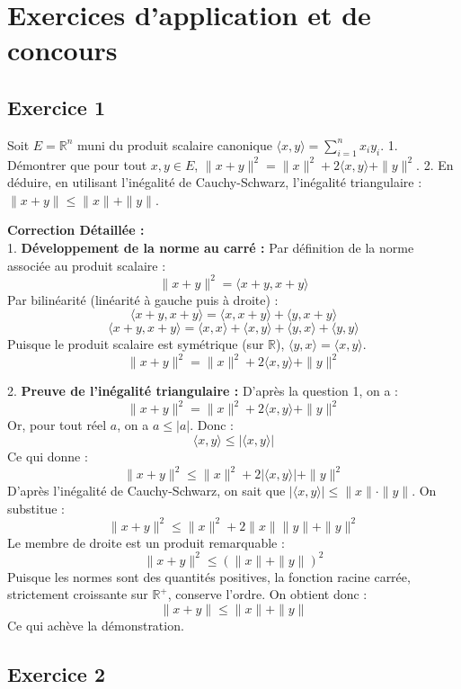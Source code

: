 \documentclass[11pt,a4paper]{report}
\begin{document}
\section{Exercices d'application et de concours}
\subsection*{Exercice 1}

Soit $E = \mathbb{R}^n$ muni du produit scalaire canonique $\langle x, y \rangle = \sum_{i=1}^n x_i y_i$.
1. Démontrer que pour tout $x, y \in E$, $\|x + y\|^2 = \|x\|^2 + 2\langle x, y \rangle + \|y\|^2$.
2. En déduire, en utilisant l'inégalité de Cauchy-Schwarz, l'inégalité triangulaire : $\|x + y\| \le \|x\| + \|y\|$.

\textbf{Correction Détaillée :}\\ 1. \textbf{Développement de la norme au carré :}
   Par définition de la norme associée au produit scalaire :
   $$\|x + y\|^2 = \langle x + y, x + y \rangle$$
   Par bilinéarité (linéarité à gauche puis à droite) :
   $$\langle x + y, x + y \rangle = \langle x, x + y \rangle + \langle y, x + y \rangle$$
   $$\langle x + y, x + y \rangle = \langle x, x \rangle + \langle x, y \rangle + \langle y, x \rangle + \langle y, y \rangle$$
   Puisque le produit scalaire est symétrique (sur $\mathbb{R}$), $\langle y, x \rangle = \langle x, y \rangle$.
   $$\|x + y\|^2 = \|x\|^2 + 2\langle x, y \rangle + \|y\|^2$$

2. \textbf{Preuve de l'inégalité triangulaire :}
   D'après la question 1, on a :
   $$\|x + y\|^2 = \|x\|^2 + 2\langle x, y \rangle + \|y\|^2$$
   Or, pour tout réel $a$, on a $a \le |a|$. Donc :
   $$\langle x, y \rangle \le |\langle x, y \rangle|$$
   Ce qui donne :
   $$\|x + y\|^2 \le \|x\|^2 + 2|\langle x, y \rangle| + \|y\|^2$$
   D'après l'inégalité de Cauchy-Schwarz, on sait que $|\langle x, y \rangle| \le \|x\| \cdot \|y\|$. On substitue :
   $$\|x + y\|^2 \le \|x\|^2 + 2\|x\|\|y\| + \|y\|^2$$
   Le membre de droite est un produit remarquable :
   $$\|x + y\|^2 \le (\|x\| + \|y\|)^2$$
   Puisque les normes sont des quantités positives, la fonction racine carrée, strictement croissante sur $\mathbb{R}^+$, conserve l'ordre. On obtient donc :
   $$\|x + y\| \le \|x\| + \|y\|$$
   Ce qui achève la démonstration.

\subsection*{Exercice 2}
\end{document}
